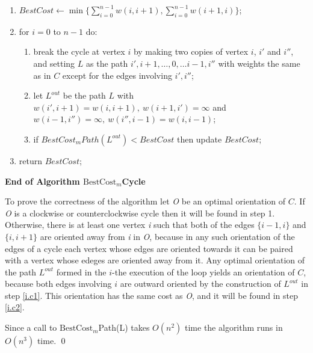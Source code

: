 \begin{enumerate}
	\item $BestCost \leftarrow \min\{\sum_{i=0}^{n-1}w(i,i+1), \sum_{i=0}^{n-1}w(i+1,i)\}$;
	\item \label{ac.i1} for $i= 0$ to $n-1$ do:
	\begin{enumerate}
		\item break the cycle at vertex $i$ by making two copies of vertex 
		$i$, $i'$ and $i''$, and setting $L$ as the path $i', i+1,\ldots ,0,\ldots i-1, i''$
		with weights the same as in $C$ except for the edges involving $i', i''$;  
		\item \label{i.c1}let $L^{out}$ be the path $L$
		with $w(i',i+1)=w(i,i+1),\ w(i+1,i')=\infty$ and 
		$w(i-1,i'')=\infty,\  w(i'',i-1)=w(i,i-1)$;
		\item \label{i.c2}
		if $BestCost_m Path(L^{out})< BestCost$ then update $BestCost$;
	\end{enumerate}		
	\item return $BestCost$; 
\end{enumerate}	
\noindent \textbf{End of Algorithm $\mbox{BestCost}_m$Cycle}
\bigskip

To prove the correctness of the algorithm let \textit{O} be an optimal orientation 
of $C$.
If \textit{O} is a clockwise or counterclockwise cycle then it will be found in step 1.
Otherwise, there is at least one vertex \textit{i} such that both of the edges $\{i-1,i\}$ and $\{i,i+1\}$
are oriented away from \textit{i} in \textit{O}, because in any such orientation of the edges
of a cycle each vertex whose edges are oriented towards it can be paired with a 
vertex whose edeges are oriented away from it.
Any optimal orientation of the path $L^{out}$ formed in 
the $i$-the execution of the loop yields an
orientation of $C$, because both edges involving $i$ are outward oriented
by the construction of $L^{out}$ in step \ref{i.c1}. This orientation has the same cost 
as \textit{O}, and it will be found in step \ref{i.c2}.

Since a call to $\mbox{BestCost}_m$Path(L) takes $O(n^2)$ time the algorithm runs in $O(n^3)$ time.
\qed

